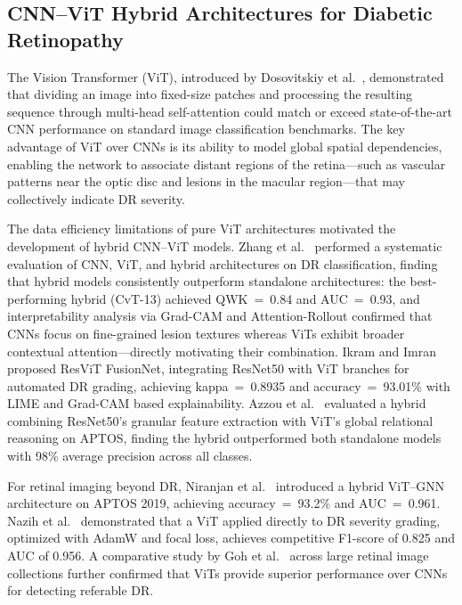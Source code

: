 \documentclass[a4paper,fleqn]{cas-dc}
\begin{document}
\subsection{CNN--ViT Hybrid Architectures for Diabetic Retinopathy}

The Vision Transformer (ViT), introduced by Dosovitskiy et al.\ \cite{dosovitskiy2021}, demonstrated that dividing an image into fixed-size patches and processing the resulting sequence through multi-head self-attention could match or exceed state-of-the-art CNN performance on standard image classification benchmarks. The key advantage of ViT over CNNs is its ability to model global spatial dependencies, enabling the network to associate distant regions of the retina---such as vascular patterns near the optic disc and lesions in the macular region---that may collectively indicate DR severity.

The data efficiency limitations of pure ViT architectures motivated the development of hybrid CNN--ViT models. Zhang et al.\ \cite{zhang2025} performed a systematic evaluation of CNN, ViT, and hybrid architectures on DR classification, finding that hybrid models consistently outperform standalone architectures: the best-performing hybrid (CvT-13) achieved QWK~=~0.84 and AUC~=~0.93, and interpretability analysis via Grad-CAM and Attention-Rollout confirmed that CNNs focus on fine-grained lesion textures whereas ViTs exhibit broader contextual attention---directly motivating their combination. Ikram and Imran \cite{ikram2025} proposed ResViT FusionNet, integrating ResNet50 with ViT branches for automated DR grading, achieving kappa~=~0.8935 and accuracy~=~93.01\% with LIME and Grad-CAM based explainability. Azzou et al.\ \cite{azzou2025} evaluated a hybrid combining ResNet50's granular feature extraction with ViT's global relational reasoning on APTOS, finding the hybrid outperformed both standalone models with 98\% average precision across all classes.

For retinal imaging beyond DR, Niranjan et al.\ \cite{niranjan2025} introduced a hybrid ViT--GNN architecture on APTOS 2019, achieving accuracy~=~93.2\% and AUC~=~0.961. Nazih et al.\ \cite{nazih2023} demonstrated that a ViT applied directly to DR severity grading, optimized with AdamW and focal loss, achieves competitive F1-score of 0.825 and AUC of 0.956. A comparative study by Goh et al.\ \cite{goh2024} across large retinal image collections further confirmed that ViTs provide superior performance over CNNs for detecting referable DR.
\end{document}

